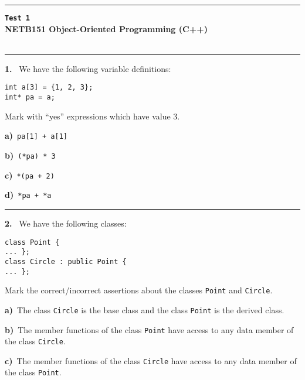\newpage\thispagestyle{empty}\par 
\hrule 
\begin{center}
{\bf\large {}}\hfill {\bf\large\verb|Test 1|}
 \hfill{\bf\large {}}\\ 
{\bf\large NETB151 Object-Oriented Programming (C++)}\\[4pt]
{\bf \large {}}\\ 
\end{center}\par
 \vspace{-4mm}
\begin{multicols}{2}
\par\smallskip\hrule\par\medskip

{\bf 1. }\ We have the following variable definitions:
 \vspace{-3mm}\begin{verbatim}
int a[3] = {1, 2, 3};
int* pa = a;
 \end{verbatim}\vspace{-6mm}
Mark with ``yes'' expressions which have value 3.

{\bf a)}\ \verb|pa[1] + a[1]|

{\bf b)}\ \verb|(*pa) * 3|

{\bf c)}\ \verb|*(pa + 2)|

{\bf d)}\ \verb|*pa + *a|

\par\smallskip\hrule\par\medskip

{\bf 2. }\ We have the following classes:
 \vspace{-3mm}\begin{verbatim}
class Point {
... };
class Circle : public Point {
... };
 \end{verbatim}\vspace{-6mm}
Mark the correct/incorrect assertions about the classes
\verb|Point| and \verb|Circle|.

{\bf a)}\ The class \verb|Circle| is the base class and the class \verb|Point| is the derived class.

{\bf b)}\ The member functions of the class \verb|Point| have access to any data member of the class \verb|Circle|.

{\bf c)}\ The member functions of the class \verb|Circle| have access to any data member of the class \verb|Point|.


\end{multicols}
